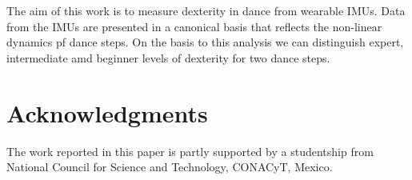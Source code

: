 \documentclass{sigchi}
\begin{document}
The aim of this work is to measure dexterity in dance from wearable IMUs. Data from the IMUs are presented
in a canonical basis that reflects the non-linear dynamics pf dance steps. On the basis to this analysis we can 
distinguish expert, intermediate amd beginner levels of dexterity for two dance steps.


\section{Acknowledgments}
The work reported in this paper is partly supported by a studentship from
National Council for Science and Technology, CONACyT, Mexico.



%
%
%
%
%
\balance





\end{document}

